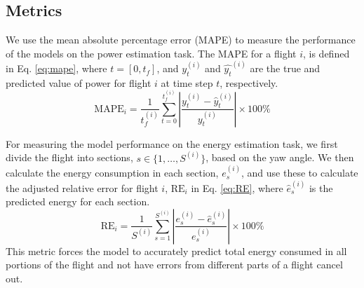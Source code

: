 \documentclass[letterpaper, 10 pt, conference]{ieeeconf}
\begin{document}
\subsection{Metrics}
We use the mean absolute percentage error (MAPE) to measure the performance of the models on the power estimation task. The MAPE for a flight $i$, is defined in Eq. \ref{eq:mape}, where $t=[0,t_f]$, and $y_t^{(i)}$ and $\hat{y_t}^{(i)}$ are the true and predicted value of power for flight $i$ at time step $t$, respectively. 
\begin{equation}
\label{eq:mape}
    \text{MAPE}_i = \frac{1}{t_f^{(i)}} \sum_{t=0}^{t_f^{(i)}} \left|\frac{y_t^{(i)} - \hat{y}_t^{(i)}}{y_t^{(i)}}\right| \times 100\%
\end{equation}

 For measuring the model performance on the energy estimation task, we first divide the flight into sections, $s \in \{1, \ldots, S^{(i)}\}$, based on the yaw angle. We then calculate the energy consumption in each section, $e_s^{(i)}$, and use these to calculate the adjusted relative error for flight $i$, $\text{RE}_i$ in Eq.  \ref{eq:RE}, where $\hat{e}_s^{(i)}$ is the predicted energy for each section. 
\begin{equation}
\label{eq:RE}
\text{RE}_i = \frac{1}{S^{(i)}} \sum_{s=1}^{S^{(i)}} \left|\frac{e_s^{(i)} - \hat{e}_s^{(i)}}{e_s^{(i)}}\right| \times 100\%
\end{equation}
This metric forces the model to accurately predict total energy consumed in all portions of the flight and not have errors from different parts of a flight cancel out.
\end{document}
